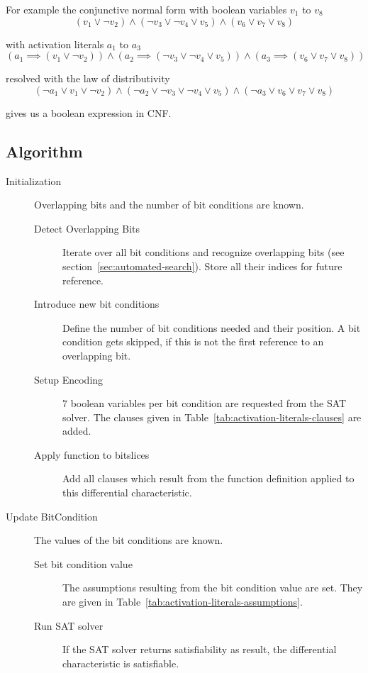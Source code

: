 For example the conjunctive normal form with boolean variables $v_1$ to $v_8$
%
\[
  (v_1 \lor \neg v_2) \land (\neg v_3 \lor \neg v_4 \lor v_5) \land
    (v_6 \lor v_7 \lor v_8)
\]

with activation literals $a_1$ to $a_3$
\[
  (a_1 \implies (v_1 \lor \neg v_2)) \land
    (a_2 \implies (\neg v_3 \lor \neg v_4 \lor v_5)) \land
    (a_3 \implies (v_6 \lor v_7 \lor v_8))
\]

resolved with the law of distributivity
\[
  (\neg a_1 \lor v_1 \lor \neg v_2) \land
    (\neg a_2 \lor \neg v_3 \lor \neg v_4 \lor v_5) \land
    (\neg a_3 \lor v_6 \lor v_7 \lor v_8)
\]

gives us a boolean expression in CNF.

\newpage
\subsection{Algorithm}
\label{sec:activation-literals-algorithm}
%
\begin{description}
  \item[Initialization] Overlapping bits and the number of bit conditions are known.
    \begin{description}
      \item[Detect Overlapping Bits] Iterate over all bit conditions and recognize overlapping bits (see section~\ref{sec:automated-search}). Store all their indices for future reference.
      \item[Introduce new bit conditions] Define the number of bit conditions needed and their position. A bit condition gets skipped, if this is not the first reference to an overlapping bit.
      \item[Setup Encoding] $7$ boolean variables per bit condition are requested from the SAT solver. The clauses given in Table~\ref{tab:activation-literals-clauses} are added.
      \item[Apply function to bitslices] Add all clauses which result from the function definition applied to this differential characteristic.
    \end{description}
  \item[Update BitCondition] The values of the bit conditions are known.
    \begin{description}
      \item[Set bit condition value] The assumptions resulting from the bit condition value are set. They are given in Table~\ref{tab:activation-literals-assumptions}.
      \item[Run SAT solver] If the SAT solver returns satisfiability as result, the differential characteristic is satisfiable.
    \end{description}
\end{description}

